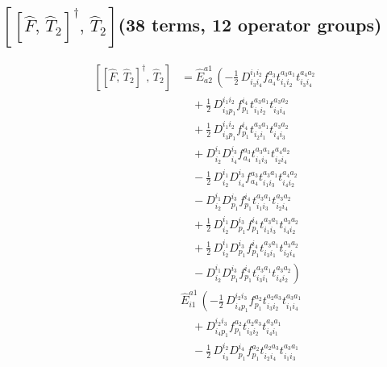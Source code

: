 \documentclass[11pt]{article}
\begin{document}
\subsection*{$\left[\left[\hat{F},\, \hat{T}_{2}\right]^{\dagger},\, \hat{T}_{2}\right]$\quad(38 terms, 12 operator groups)}
\begin{align}
\left[\left[\hat{F},\, \hat{T}_{2}\right]^{\dagger},\, \hat{T}_{2}\right] &= \hat{E}^{a1}_{a2}\,\left(- \tfrac{1}{2}\, D^{i_{1}i_{2}}_{i_{3}i_{4}} f^{a_{3}}_{a_{4}} t^{a_{3}a_{1}}_{i_{1}i_{2}} t^{a_{4}a_{2}}_{i_{3}i_{4}} \right. \\
&\left.\quad + \tfrac{1}{2}\, D^{i_{1}i_{2}}_{i_{3}p_{1}} f^{i_{4}}_{p_{1}} t^{a_{3}a_{1}}_{i_{1}i_{2}} t^{a_{3}a_{2}}_{i_{3}i_{4}} \right. \\
&\left.\quad + \tfrac{1}{2}\, D^{i_{1}i_{2}}_{i_{3}p_{1}} f^{i_{4}}_{p_{1}} t^{a_{3}a_{1}}_{i_{2}i_{1}} t^{a_{3}a_{2}}_{i_{4}i_{3}} \right. \\
&\left.\quad + D^{i_{1}}_{i_{2}} D^{i_{3}}_{i_{4}} f^{a_{3}}_{a_{4}} t^{a_{3}a_{1}}_{i_{1}i_{3}} t^{a_{4}a_{2}}_{i_{2}i_{4}} \right. \\
&\left.\quad - \tfrac{1}{2}\, D^{i_{1}}_{i_{2}} D^{i_{3}}_{i_{4}} f^{a_{3}}_{a_{4}} t^{a_{3}a_{1}}_{i_{1}i_{3}} t^{a_{4}a_{2}}_{i_{4}i_{2}} \right. \\
&\left.\quad - D^{i_{1}}_{i_{2}} D^{i_{3}}_{p_{1}} f^{i_{4}}_{p_{1}} t^{a_{3}a_{1}}_{i_{1}i_{3}} t^{a_{3}a_{2}}_{i_{2}i_{4}} \right. \\
&\left.\quad + \tfrac{1}{2}\, D^{i_{1}}_{i_{2}} D^{i_{3}}_{p_{1}} f^{i_{4}}_{p_{1}} t^{a_{3}a_{1}}_{i_{1}i_{3}} t^{a_{3}a_{2}}_{i_{4}i_{2}} \right. \\
&\left.\quad + \tfrac{1}{2}\, D^{i_{1}}_{i_{2}} D^{i_{3}}_{p_{1}} f^{i_{4}}_{p_{1}} t^{a_{3}a_{1}}_{i_{3}i_{1}} t^{a_{3}a_{2}}_{i_{2}i_{4}} \right. \\
&\left.\quad - D^{i_{1}}_{i_{2}} D^{i_{3}}_{p_{1}} f^{i_{4}}_{p_{1}} t^{a_{3}a_{1}}_{i_{3}i_{1}} t^{a_{3}a_{2}}_{i_{4}i_{2}} \right) \\
&\hat{E}^{a1}_{i1}\,\left(- \tfrac{1}{2}\, D^{i_{2}i_{3}}_{i_{4}p_{1}} f^{a_{2}}_{p_{1}} t^{a_{2}a_{3}}_{i_{3}i_{2}} t^{a_{3}a_{1}}_{i_{1}i_{4}} \right. \\
&\left.\quad + D^{i_{2}i_{3}}_{i_{4}p_{1}} f^{a_{2}}_{p_{1}} t^{a_{2}a_{3}}_{i_{3}i_{2}} t^{a_{3}a_{1}}_{i_{4}i_{1}} \right. \\
&\left.\quad - \tfrac{1}{2}\, D^{i_{2}}_{i_{3}} D^{i_{4}}_{p_{1}} f^{a_{2}}_{p_{1}} t^{a_{2}a_{3}}_{i_{2}i_{4}} t^{a_{3}a_{1}}_{i_{1}i_{3}} \right. \\

\end{align}
\end{document}

